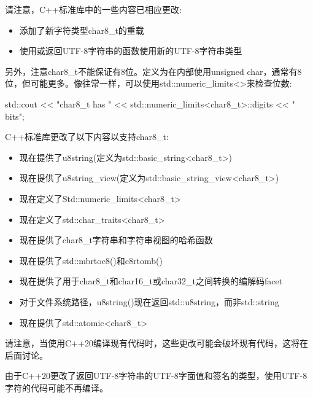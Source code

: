 请注意，C++标准库中的一些内容已相应更改:

\begin{itemize}
\item 
添加了新字符类型char8\_t的重载

\item 
使用或返回UTF-8字符串的函数使用新的UTF-8字符串类型
\end{itemize}

另外，注意char8\_t不能保证有8位。定义为在内部使用unsigned char，通常有8位，但可能更多。像往常一样，可以使用std::numeric\_limits<>来检查位数:

\begin{cpp}
std::cout << "char8_t has "
		  << std::numeric_limits<char8_t>::digits << " bits\n";
\end{cpp}



C++标准库更改了以下内容以支持char8\_t:

\begin{itemize}
\item 
现在提供了u8string(定义为std::basic\_string<char8\_t>)

\item 
现在提供了u8string\_view(定义为std::basic\_string\_view<char8\_t>)

\item 
现在定义了Std::numeric\_limits<char8\_t>

\item 
现在定义了std::char\_traits<char8\_t>

\item 
现在提供了char8\_t字符串和字符串视图的哈希函数

\item 
现在提供了std::mbrtoc8()和c8rtomb()

\item 
现在提供了用于char8\_t和char16\_t或char32\_t之间转换的编解码facet

\item 
对于文件系统路径，u8string()现在返回std::u8string，而非std::string

\item 
现在提供了std::atomic<char8\_t>
\end{itemize}

请注意，当使用C++20编译现有代码时，这些更改可能会破坏现有代码，这将在后面讨论。


由于C++20更改了返回UTF-8字符串的UTF-8字面值和签名的类型，使用UTF-8字符的代码可能不再编译。

